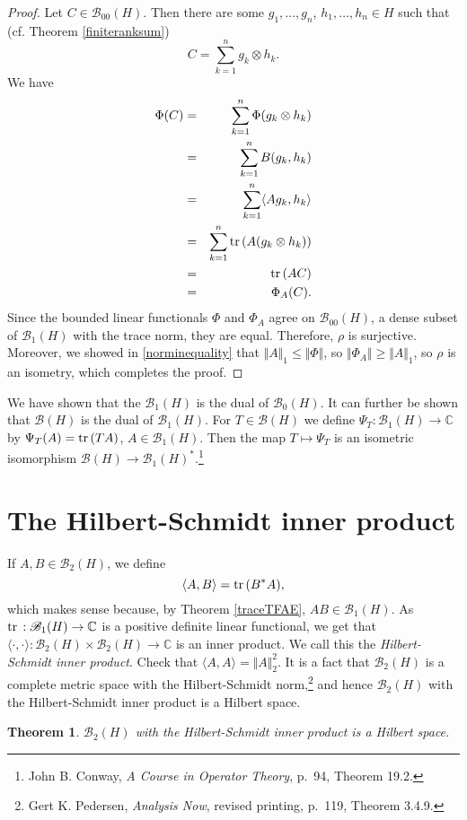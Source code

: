 \documentclass{article}
\newcommand{\inner}[2]{\langle #1, #2 \rangle}
\newcommand{\tr}{\ensuremath\mathrm{tr}\,}
\newcommand{\norm}[1]{\Vert #1 \Vert}
\newtheorem{theorem}{Theorem}
\begin{document}
\begin{proof}
Let $C \in \mathscr{B}_{00}(H)$. Then there are some $g_1,\ldots,g_n$, $h_1,\ldots,h_n \in H$ such that (cf. Theorem \ref{finiteranksum})
\[
C = \sum_{k=1}^n g_k \otimes h_k.
\]
We have
\begin{eqnarray*}
\Phi(C)&=&\sum_{k=1}^n \Phi( g_k \otimes h_k)\\
&=&\sum_{k=1}^n B(g_k,h_k)\\
&=&\sum_{k=1}^n \inner{Ag_k}{h_k}\\
&=&\sum_{k=1}^n \tr (A(g_k \otimes h_k))\\
&=&\tr(AC)\\
&=&\Phi_A(C).
\end{eqnarray*}
Since the bounded linear functionals $\Phi$ and $\Phi_A$ agree on $\mathscr{B}_{00}(H)$,  a dense subset of $\mathscr{B}_1(H)$ with the
trace norm, they are equal. Therefore, $\rho$ is surjective. Moreover, we showed in \eqref{norminequality} that
$\norm{A}_1 \leq \norm{\Phi}$, so $\norm{\Phi_A} \geq \norm{A}_1$, so  $\rho$ is an isometry, which  completes the proof.
\end{proof}




We have shown that the $\mathscr{B}_1(H)$ is the dual of $\mathscr{B}_0(H)$. It can further be shown that
$\mathscr{B}(H)$ is the dual of $\mathscr{B}_1(H)$. For 
$T \in \mathscr{B}(H)$ we define $\Psi_T:\mathscr{B}_1(H) \to \mathbb{C}$ by 
$\Psi_T(A)=\tr(TA)$, $A \in \mathscr{B}_1(H)$.
Then the map $T \mapsto \Psi_T$ is an isometric isomorphism $\mathscr{B}(H) \to \mathscr{B}_1(H)^*$.\footnote{John B. Conway, {\em A Course in Operator Theory}, p.~94, Theorem 19.2.} 






\section{The Hilbert-Schmidt inner product}
If $A,B \in \mathscr{B}_2(H)$, we define
\[
\inner{A}{B} = \tr(B^*A),
\]
which makes sense because, by Theorem \ref{traceTFAE}, $AB \in \mathscr{B}_1(H)$.
As $\tr:\mathscr{B}_1(H) \to \mathbb{C}$ is a positive definite linear functional, we get that $\inner{\cdot}{\cdot}:\mathscr{B}_2(H) \times \mathscr{B}_2(H) \to \mathbb{C}$
is an inner product. 
We call this the {\em Hilbert-Schmidt inner product}. Check that $\inner{A}{A}=\norm{A}_2^2$.
It is a fact that $\mathscr{B}_2(H)$ is a complete metric space with the Hilbert-Schmidt norm,\footnote{Gert K. Pedersen,
{\em Analysis Now}, revised printing, p.~119, Theorem 3.4.9.} and hence $\mathscr{B}_2(H)$ with the Hilbert-Schmidt inner product
is a Hilbert space.



\begin{theorem}
$\mathscr{B}_2(H)$ with the Hilbert-Schmidt inner product is a Hilbert space.
\end{theorem}
\end{document}
